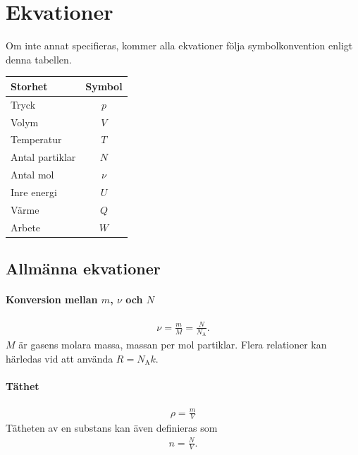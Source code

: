 \section{Ekvationer}

Om inte annat specifieras, kommer alla ekvationer följa symbolkonvention enligt denna tabellen.

\begin{table}[!h]
	\centering
	\begin{tabular}{| l | c |}
		\hline
		\textbf{Storhet} & \multicolumn{1}{|l|}{\textbf{Symbol}}\\
		\hline
		Tryck           & $p$ \\
		\hline
		Volym           & $V$ \\
		\hline
		Temperatur      & $T$ \\
		\hline
		Antal partiklar & $N$ \\
		\hline
		Antal mol       & $\nu$ \\
		\hline
		Inre energi     & $U$ \\
		\hline
		Värme           & $Q$ \\
		\hline
		Arbete          & $W$ \\
		\hline
	\end{tabular}
\end{table}

\twocolumn

\subsection{Allmänna ekvationer}

\paragraph{Konversion mellan $m$, $\nu$ och $N$}
\begin{align*}
	\nu = \frac{m}{M} = \frac{N}{N_\text{A}}.
\end{align*}
$M$ är gasens molara massa, massan per mol partiklar. Flera relationer kan härledas vid att använda $R = N_\text{A}k$.

\paragraph{Täthet}
\begin{align*}
	\rho = \frac{m}{V}
\end{align*}
Tätheten av en substans kan även definieras som
\begin{align*}
	n = \frac{N}{V}.
\end{align*}

